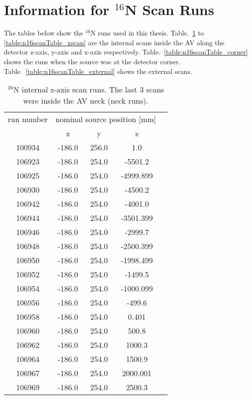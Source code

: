 \section{Information for $^{16}$N Scan Runs}\label{appendix:calibration}
The tables below show the $^{16}$N runs used in this thesis. Table.~\ref{table:n16scanTable_zscan} to \ref{table:n16scanTable_xscan} are the internal scans inside the AV along the detector z-axis, y-axis and x-axis respectively. Table.~\ref{table:n16scanTable_corner} shows the runs when the source was at the detector corner. Table.~\ref{table:n16scanTable_external} shows the external scans.
\begin{table}[ht]
		\caption[]{$^{16}$N internal z-axis scan runs. The last 3 scans were inside the AV neck (neck runs).}
		\label{table:n16scanTable_zscan}
			\centering
	\begin{tabular*}{90mm}{c@{\extracolsep{\fill}}*4c}
		\toprule 
		run number  & \multicolumn{3}{c}{nominal source position [mm]}  \\
                                \cline{2-4}
			& x & y & z\\
		\midrule
		100934 & -186.0 & 256.0 & 1.0\\
        106923 & -186.0 & 254.0 & -5501.2\\
        106925 & -186.0 & 254.0 & -4999.899\\
        106930 & -186.0 & 254.0 & -4500.2\\
        106942 & -186.0 & 254.0 & -4001.0\\
        106944 & -186.0 & 254.0 & -3501.399\\
        106946 & -186.0 & 254.0 & -2999.7\\
        106948 & -186.0 & 254.0 & -2500.399\\
        106950 & -186.0 & 254.0 & -1998.499\\
        106952 & -186.0 & 254.0 & -1499.5\\
        106954 & -186.0 & 254.0 & -1000.099\\
        106956 & -186.0 & 254.0 & -499.6\\
        106958 & -186.0 & 254.0 & 0.401 \\
        106960 & -186.0 & 254.0 & 500.8\\
        106962 & -186.0 & 254.0 & 1000.3\\
        106964 & -186.0 & 254.0 & 1500.9\\
        106967 & -186.0 & 254.0 & 2000.001\\
        106969 & -186.0 & 254.0 & 2500.3\\

\end{tabular*}
\end{table}
